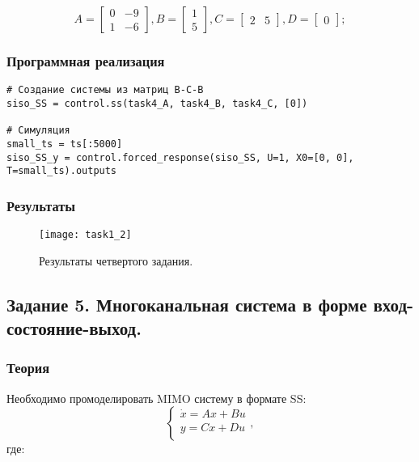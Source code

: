 \documentclass[16pt]{article}
\begin{document}
\[ 
    A = \begin{bmatrix}
        0 &  -9 \\
        1 &  -6 
        \end{bmatrix},
        B = \begin{bmatrix}
            1 \\
            5
            \end{bmatrix},
        C = \begin{bmatrix}
            2 & 5
            \end{bmatrix},
        D = \begin{bmatrix}
            0
            \end{bmatrix};
\]

\subsubsection{Программная реализация}
\begin{verbatim}
# Создание системы из матриц В-С-В
siso_SS = control.ss(task4_A, task4_B, task4_C, [0])

# Симуляция
small_ts = ts[:5000]
siso_SS_y = control.forced_response(siso_SS, U=1, X0=[0, 0], T=small_ts).outputs
\end{verbatim}

\subsubsection{Результаты}
\begin{figure}[H]
	\centering
	\texttt{[image: task1\_2]}
	\caption{Результаты четвертого задания.}
	\label{fig:fig4}
\end{figure}


\newpage
\subsection{Задание 5. Многоканальная система в форме вход-состояние-выход.}
\subsubsection{Теория}
Необходимо промоделировать MIMO систему в формате SS:
\[ 
    \begin{cases}
        \dot{x} = Ax + Bu \\
        y = Cx + Du \\
    \end{cases},
\]
где:
\end{document}
